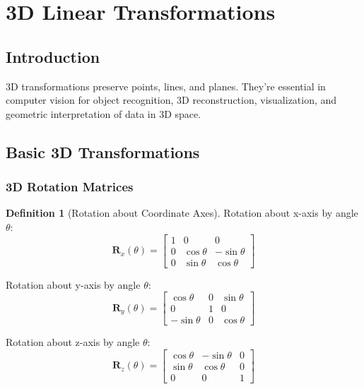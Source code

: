 \documentclass[12pt,a4paper]{article}
\theoremstyle{definition}
\newtheorem{definition}{Definition}[section]
\begin{document}
\newpage

\section{3D Linear Transformations}

\subsection{Introduction}

\begin{tcolorbox}[enhanced,breakable,colback=defcolor,colframe=red!75!black,title=3D Transformations in ML/DL]
3D transformations preserve points, lines, and planes. They're essential in computer vision for object recognition, 3D reconstruction, visualization, and geometric interpretation of data in 3D space.
\end{tcolorbox}

\subsection{Basic 3D Transformations}

\subsubsection{3D Rotation Matrices}

\begin{definition}[Rotation about Coordinate Axes]
Rotation about x-axis by angle $\theta$:
\[
\mathbf{R}_x(\theta) = \begin{bmatrix}
1 & 0 & 0 \\
0 & \cos\theta & -\sin\theta \\
0 & \sin\theta & \cos\theta
\end{bmatrix}
\]

Rotation about y-axis by angle $\theta$:
\[
\mathbf{R}_y(\theta) = \begin{bmatrix}
\cos\theta & 0 & \sin\theta \\
0 & 1 & 0 \\
-\sin\theta & 0 & \cos\theta
\end{bmatrix}
\]

Rotation about z-axis by angle $\theta$:
\[
\mathbf{R}_z(\theta) = \begin{bmatrix}
\cos\theta & -\sin\theta & 0 \\
\sin\theta & \cos\theta & 0 \\
0 & 0 & 1
\end{bmatrix}
\]
\end{definition}
\end{document}
